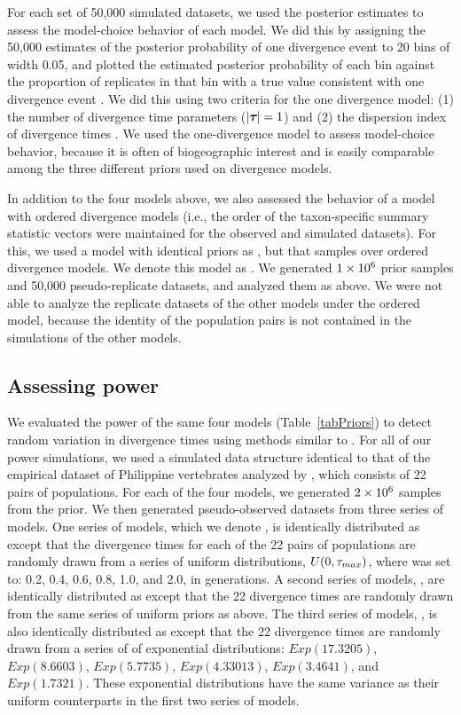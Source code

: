 \documentclass[letterpaper,12pt]{article}
\begin{document}
\begin{linenumbers}
For each set of 50,000 simulated datasets, we used the posterior estimates
to assess the model-choice behavior of each model.
We did this by assigning the 50,000 estimates of the posterior probability
of one divergence event to 20 bins of width 0.05, and plotted
the estimated posterior probability of each bin against the proportion of
replicates in that bin with a true value consistent with one divergence
event \citep{Huelsenbeck2004,Oaks2012}.
We did this using two criteria for the one divergence model:
(1) the number of divergence time parameters ($\lvert \boldsymbol{\tau_{}} \rvert = 1$) and
(2) the dispersion index of divergence times \citep[$\divTimeDispersion <
0.01$][]{Hickerson2006,Huang2011}.
We used the one-divergence model to assess model-choice behavior, because
it is often of biogeographic interest and is easily comparable among
the three different priors used on divergence models.

In addition to the four models above, we also assessed the behavior of a model
with ordered divergence models (i.e., the order of the taxon-specific summary
statistic vectors were maintained for the observed and simulated datasets).
For this, we used a model with identical priors as \modelDPP, but that samples
over ordered divergence models.
We denote this model as \modelDPPOrdered.
We generated $1\times 10^{6}$ prior samples and 50,000 pseudo-replicate datasets, and
analyzed them as above.
We were not able to analyze the replicate datasets of the other models under
the ordered model, because the identity of the population pairs is not
contained in the simulations of the other models.

\subsection*{Assessing power}
We evaluated the power of the same four models (Table~\ref{tabPriors}) to
detect random variation in divergence times using methods similar to
\citet{Oaks2012}.
For all of our power simulations, we used a simulated data structure identical
to that of the empirical dataset of Philippine vertebrates analyzed by
\citet{Oaks2012}, which consists of 22 pairs of populations.
For each of the four models, we generated $2\times 10^{6}$ samples from the prior.
We then generated pseudo-observed datasets from three series of models.
One series of models, which we denote \powerSeriesOld, is identically
distributed as \modelOld except that the divergence times for each of the 22
pairs of populations are randomly drawn from a series of uniform distributions,
$U(0, \tau_{max})$, where  was set to: 0.2, 0.4, 0.6, 0.8, 1.0, and
2.0, in \globalcoalunit generations.
A second series of models, \powerSeriesUniform, are identically distributed as
\modelUniform except that the 22 divergence times are randomly drawn from the
same series of uniform priors as above.
The third series of models, \powerSeriesExp, is also identically
distributed as \modelUniform except that the 22 divergence times are randomly
drawn from a series of of exponential distributions: $Exp(17.3205)$,
$Exp(8.6603)$, $Exp(5.7735)$, $Exp(4.33013)$, $Exp(3.4641)$, and $Exp(1.7321)$.
These exponential distributions have the same variance as their uniform
counterparts in the first two series of models.


\end{linenumbers}
\end{document}
